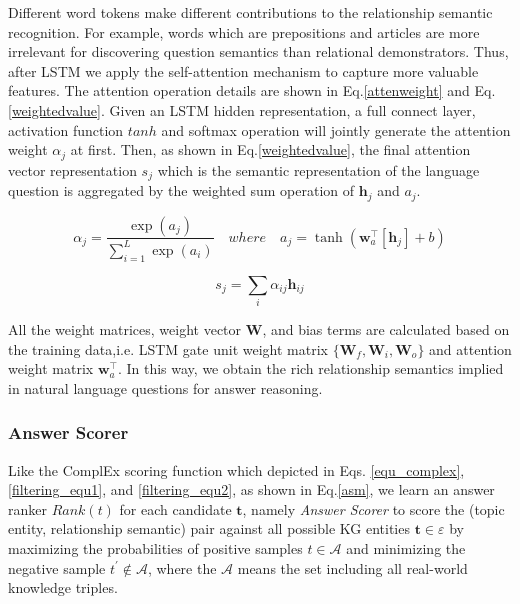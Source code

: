 \documentclass[pdflatex,sn-mathphys]{sn-jnl}%
\theoremstyle{thmstyleone}%
\theoremstyle{thmstyletwo}%
\theoremstyle{thmstylethree}%
\begin{document}
Different word tokens make different contributions to the relationship semantic recognition. For example, words which are prepositions and articles are more irrelevant for discovering question semantics than relational demonstrators. Thus, after LSTM we apply the self-attention mechanism to capture more valuable features. The attention operation details are shown in Eq.\ref{attenweight} and Eq.\ref{weightedvalue}. Given an LSTM hidden representation, a full connect layer, activation function $tanh$ and softmax operation will jointly generate the attention weight $\alpha_{j}$ at first. Then, as shown in Eq.\ref{weightedvalue}, the final attention vector representation $s_{j}$ which is the semantic representation of the language question is aggregated by the weighted sum operation of $\mathbf{h}_{j}$ and $a_{j}$.

\begin{equation}
\label{attenweight}
\alpha_{j}=\frac{\exp \left(a_{j}\right)}{\sum_{i=1}^{L} \exp \left(a_{i}\right)} \quad where\quad  a_{j}=\tanh \left(\mathbf{w}_{a}^{\top}\left[\mathbf{h}_{j}\right]+b\right)
\end{equation}

\begin{equation}
\label{weightedvalue}
s_{j}=\sum_{i} \alpha_{i j} \mathbf{h}_{i j}
\end{equation}

All the weight matrices, weight vector $\mathbf{W}$, and bias terms are calculated based on the training data,i.e. LSTM gate unit weight matrix $\{\mathbf{W}_{f},\mathbf{W}_{i},\mathbf{W}_{o}\}$ and attention weight matrix $\mathbf{w}_{a}^{\top}$. In this way, we obtain the rich relationship semantics implied in natural language questions for answer reasoning.

\subsubsection{Answer Scorer}
Like the ComplEx \cite{trouillon2016ComplEx} scoring function which depicted in Eqs. \ref{equ_complex}, \ref{filtering_equ1}, and \ref{filtering_equ2}, as shown in Eq.\ref{asm}, we learn an answer ranker $Rank\left(t\right)$ for each candidate $\textbf{t}$, namely \textit{Answer Scorer} to score the (topic entity, relationship semantic) pair against all possible KG entities $\textbf{t} \in \varepsilon$ by maximizing the probabilities of positive samples $t \in \mathcal{A}$ and minimizing the negative sample $t^{\prime} \notin \mathcal{A}$, where the $\mathcal{A}$ means the set including all real-world knowledge triples. 
\end{document}
